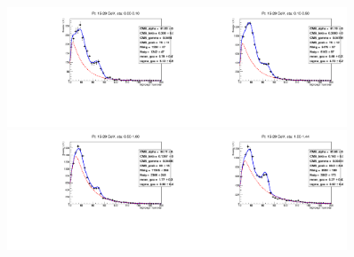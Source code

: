 \begin{figure}[htb]
  \begin{center}
   \includegraphics[width=0.45\textwidth]{../figs/figs_v11/ELECTRON_WGamma/EtoGammaFits/sa_hZmass_h_Data_EtoGamma_Enr_BARREL_pt15to20_ieta0_noWMtCut.pdf}\includegraphics[width=0.45\textwidth]{../figs/figs_v11/ELECTRON_WGamma/EtoGammaFits/sa_hZmass_h_Data_EtoGamma_Enr_BARREL_pt15to20_ieta1_noWMtCut.pdf}\\
   \includegraphics[width=0.45\textwidth]{../figs/figs_v11/ELECTRON_WGamma/EtoGammaFits/sa_hZmass_h_Data_EtoGamma_Enr_BARREL_pt15to20_ieta2_noWMtCut.pdf}\includegraphics[width=0.45\textwidth]{../figs/figs_v11/ELECTRON_WGamma/EtoGammaFits/sa_hZmass_h_Data_EtoGamma_Enr_BARREL_pt15to20_ieta3_noWMtCut.pdf}\\

\end{center}
\end{figure}
